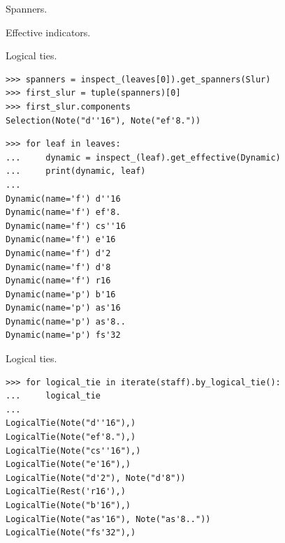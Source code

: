 Spanners.

Effective indicators.

Logical ties.

\begin{lstlisting}
>>> spanners = inspect_(leaves[0]).get_spanners(Slur)
>>> first_slur = tuple(spanners)[0]
>>> first_slur.components
Selection(Note("d''16"), Note("ef'8."))
\end{lstlisting}


\begin{lstlisting}
>>> for leaf in leaves:
...     dynamic = inspect_(leaf).get_effective(Dynamic)
...     print(dynamic, leaf)
... 
Dynamic(name='f') d''16
Dynamic(name='f') ef'8.
Dynamic(name='f') cs''16
Dynamic(name='f') e'16
Dynamic(name='f') d'2
Dynamic(name='f') d'8
Dynamic(name='f') r16
Dynamic(name='p') b'16
Dynamic(name='p') as'16
Dynamic(name='p') as'8..
Dynamic(name='p') fs'32
\end{lstlisting}


Logical ties.

\begin{lstlisting}
>>> for logical_tie in iterate(staff).by_logical_tie():
...     logical_tie
... 
LogicalTie(Note("d''16"),)
LogicalTie(Note("ef'8."),)
LogicalTie(Note("cs''16"),)
LogicalTie(Note("e'16"),)
LogicalTie(Note("d'2"), Note("d'8"))
LogicalTie(Rest('r16'),)
LogicalTie(Note("b'16"),)
LogicalTie(Note("as'16"), Note("as'8.."))
LogicalTie(Note("fs'32"),)
\end{lstlisting}

